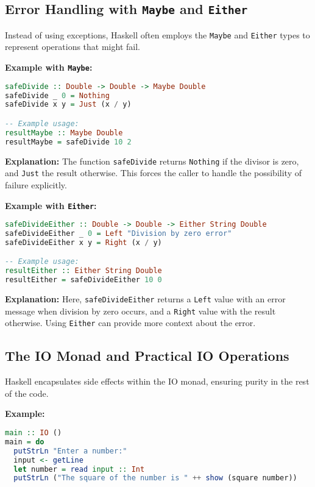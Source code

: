 \documentclass[11pt,a4paper]{article}
\begin{document}
\subsection{Error Handling with \texttt{Maybe} and \texttt{Either}}
Instead of using exceptions, Haskell often employs the \texttt{Maybe} and \texttt{Either} types to represent operations that might fail.

\textbf{Example with \texttt{Maybe}:}
\begin{lstlisting}[language=Haskell]
safeDivide :: Double -> Double -> Maybe Double
safeDivide _ 0 = Nothing
safeDivide x y = Just (x / y)

-- Example usage:
resultMaybe :: Maybe Double
resultMaybe = safeDivide 10 2
\end{lstlisting}

\textbf{Explanation:}  
The function \texttt{safeDivide} returns \texttt{Nothing} if the divisor is zero, and \texttt{Just} the result otherwise. This forces the caller to handle the possibility of failure explicitly.

\textbf{Example with \texttt{Either}:}
\begin{lstlisting}[language=Haskell]
safeDivideEither :: Double -> Double -> Either String Double
safeDivideEither _ 0 = Left "Division by zero error"
safeDivideEither x y = Right (x / y)

-- Example usage:
resultEither :: Either String Double
resultEither = safeDivideEither 10 0
\end{lstlisting}

\textbf{Explanation:}  
Here, \texttt{safeDivideEither} returns a \texttt{Left} value with an error message when division by zero occurs, and a \texttt{Right} value with the result otherwise. Using \texttt{Either} can provide more context about the error.

\subsection{The IO Monad and Practical IO Operations}
Haskell encapsulates side effects within the IO monad, ensuring purity in the rest of the code.

\textbf{Example:}
\begin{lstlisting}[language=Haskell]
main :: IO ()
main = do
  putStrLn "Enter a number:"
  input <- getLine
  let number = read input :: Int
  putStrLn ("The square of the number is " ++ show (square number))
\end{lstlisting}
\end{document}
